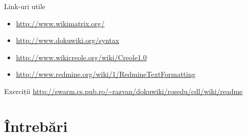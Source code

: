\documentclass{beamer}
\begin{document}
\begin{frame}{Link-uri utile}
  \begin{itemize}
    \item \url{http://www.wikimatrix.org/}
    \item \url{http://www.dokuwiki.org/syntax}
    \item \url{http://www.wikicreole.org/wiki/Creole1.0}
    \item \url{http://www.redmine.org/wiki/1/RedmineTextFormatting}
  \end{itemize}
\end{frame}

\begin{frame}{Exerciții}
  \footnotesize \url{http://swarm.cs.pub.ro/~razvan/dokuwiki/rosedu/cdl/wiki/readme}
\end{frame}


\section{\^{I}ntrebări}

\frame{\tableofcontents[currentsection]}
\end{document}
